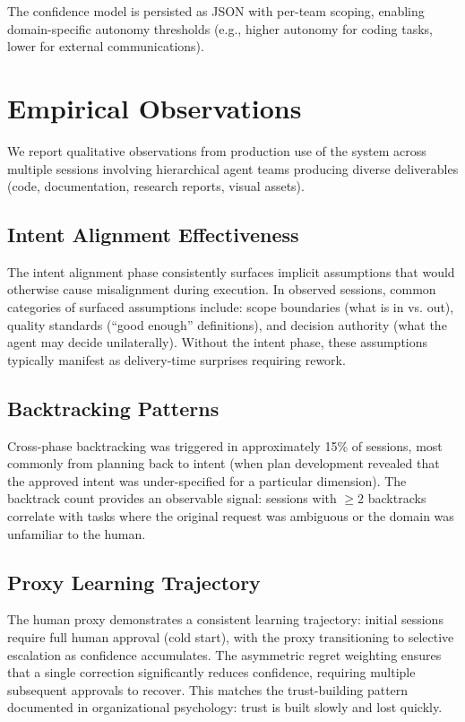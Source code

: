\documentclass[11pt,a4paper]{article}
\begin{document}
The confidence model is persisted as JSON with per-team scoping,
enabling domain-specific autonomy thresholds (e.g., higher autonomy
for coding tasks, lower for external communications).

\section{Empirical Observations}
\label{sec:evaluation}

We report qualitative observations from production use of the system
across multiple sessions involving hierarchical agent teams producing
diverse deliverables (code, documentation, research reports, visual
assets).

\subsection{Intent Alignment Effectiveness}

The intent alignment phase consistently surfaces implicit assumptions
that would otherwise cause misalignment during execution. In
observed sessions, common categories of surfaced assumptions include:
scope boundaries (what is in vs. out), quality standards (``good enough''
definitions), and decision authority (what the agent may decide
unilaterally). Without the intent phase, these assumptions typically
manifest as delivery-time surprises requiring rework.

\subsection{Backtracking Patterns}

Cross-phase backtracking was triggered in approximately 15\% of
sessions, most commonly from planning back to intent (when plan
development revealed that the approved intent was under-specified
for a particular dimension). The backtrack count provides an
observable signal: sessions with $\geq 2$ backtracks correlate
with tasks where the original request was ambiguous or the domain
was unfamiliar to the human.

\subsection{Proxy Learning Trajectory}

The human proxy demonstrates a consistent learning trajectory:
initial sessions require full human approval (cold start), with
the proxy transitioning to selective escalation as confidence
accumulates. The asymmetric regret weighting ensures that a single
correction significantly reduces confidence, requiring multiple
subsequent approvals to recover. This matches the trust-building
pattern documented in organizational psychology:
trust is built slowly and lost quickly.
\end{document}
